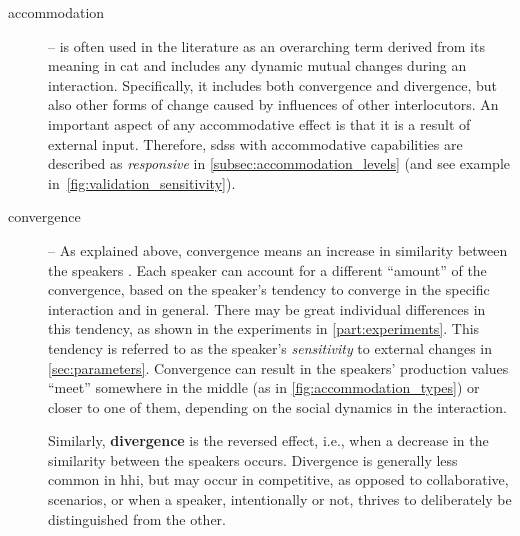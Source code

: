 \begin{description}
	\item[accommodation] -- is often used in the literature as an overarching term derived from its meaning in \ac{cat} and includes any dynamic mutual changes during an interaction.
	Specifically, it includes both convergence and divergence, but also other forms of change caused by influences of other interlocutors.
	An important aspect of any accommodative effect is that it is a result of external input.
	Therefore, \acp{sds} with accommodative capabilities are described as \emph{responsive} in \cref{subsec:accommodation_levels} (and see example in~\cref{fig:validation_sensitivity}).
	
	\item[convergence] -- As explained above, convergence means an increase in similarity between the speakers \citep[see Figure 1 in][]{Levitan2011measuring}.
	Each speaker can account for a different \enquote{amount} of the convergence, based on the speaker's tendency to converge in the specific interaction and in general.
	There may be great individual differences in this tendency, as shown in the experiments in \cref{part:experiments}.
	This tendency is referred to as the speaker's \emph{sensitivity} to external changes in \cref{sec:parameters}.
	Convergence can result in the speakers' production values \enquote{meet} somewhere in the middle (as in \cref{fig:accommodation_types}) or closer to one of them, depending on the social dynamics in the interaction.
	
	Similarly, \textbf{divergence} is the reversed effect, i.e., when a decrease in the similarity between the speakers occurs.
	Divergence is generally less common in \ac{hhi}, but may occur in competitive, as opposed to collaborative, scenarios, or when a speaker, intentionally or not, thrives to deliberately be distinguished from the other.
	

\end{description}

